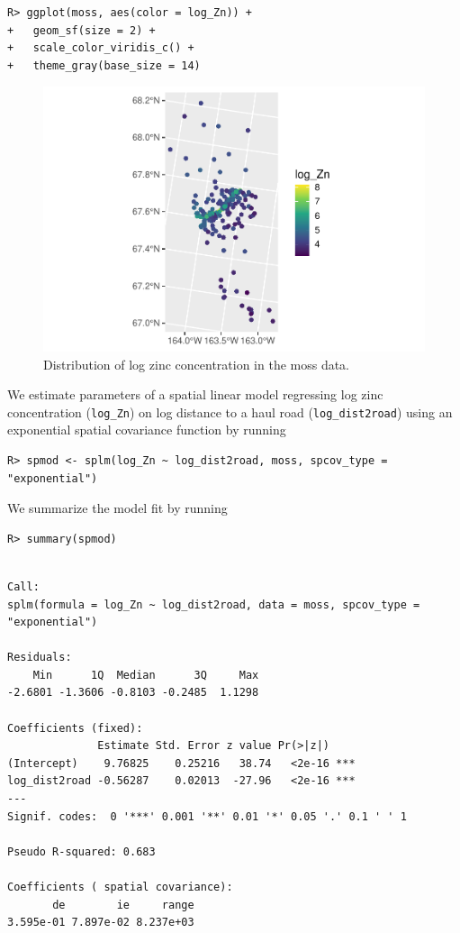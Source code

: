 \documentclass{article}
\begin{document}
\begin{verbatim}
R> ggplot(moss, aes(color = log_Zn)) +
+   geom_sf(size = 2) +
+   scale_color_viridis_c() +
+   theme_gray(base_size = 14)
\end{verbatim}

\begin{figure}

{\centering \includegraphics[width=0.65\linewidth]{preprint_files/figure-latex/log_zn-1} 

}

\caption{Distribution of log zinc concentration in the moss data.}\label{fig:log_zn}
\end{figure}

We estimate parameters of a spatial linear model regressing log zinc
concentration (\texttt{log\_Zn}) on log distance to a haul road
(\texttt{log\_dist2road}) using an exponential spatial covariance
function by running

\begin{verbatim}
R> spmod <- splm(log_Zn ~ log_dist2road, moss, spcov_type = "exponential")
\end{verbatim}

We summarize the model fit by running

\begin{verbatim}
R> summary(spmod)
\end{verbatim}

\begin{verbatim}

Call:
splm(formula = log_Zn ~ log_dist2road, data = moss, spcov_type = "exponential")

Residuals:
    Min      1Q  Median      3Q     Max 
-2.6801 -1.3606 -0.8103 -0.2485  1.1298 

Coefficients (fixed):
              Estimate Std. Error z value Pr(>|z|)    
(Intercept)    9.76825    0.25216   38.74   <2e-16 ***
log_dist2road -0.56287    0.02013  -27.96   <2e-16 ***
---
Signif. codes:  0 '***' 0.001 '**' 0.01 '*' 0.05 '.' 0.1 ' ' 1

Pseudo R-squared: 0.683

Coefficients ( spatial covariance):
       de        ie     range 
3.595e-01 7.897e-02 8.237e+03 
\end{verbatim}
\end{document}
